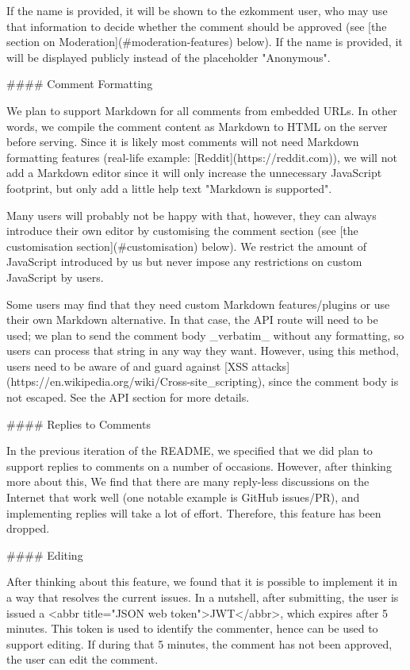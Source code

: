 \documentclass[11pt]{article}
\begin{document}
\begin{markdown}
If the name is provided, it will be shown to the ezkomment user, who may use that information to decide whether the comment should be approved (see [the section on Moderation](#moderation-features) below). If the name is provided, it will be displayed publicly instead of the placeholder "Anonymous".

#### Comment Formatting

We plan to support Markdown for all comments from embedded URLs. In other words, we compile the comment content as Markdown to HTML on the server before serving. Since it is likely most comments will not need Markdown formatting features (real-life example: [Reddit](https://reddit.com)), we will not add a Markdown editor since it will only increase the unnecessary JavaScript footprint, but only add a little help text "Markdown is supported".

Many users will probably not be happy with that, however, they can always introduce their own editor by customising the comment section (see [the customisation section](#customisation) below). We restrict the amount of JavaScript introduced by us but never impose any restrictions on custom JavaScript by users.

Some users may find that they need custom Markdown features/plugins or use their own Markdown alternative. In that case, the API route will need to be used; we plan to send the comment body _verbatim_ without any formatting, so users can process that string in any way they want. However, using this method, users need to be aware of and guard against [XSS attacks](https://en.wikipedia.org/wiki/Cross-site_scripting), since the comment body is not escaped. See the API section for more details.

#### Replies to Comments

In the previous iteration of the README, we specified that we did plan to support replies to comments on a number of occasions. However, after thinking more about this, We find that there are many reply-less discussions on the Internet that work well (one notable example is GitHub issues/PR), and implementing replies will take a lot of effort. Therefore, this feature has been dropped.

#### Editing

After thinking about this feature, we found that it is possible to implement it in a way that resolves the current issues. In a nutshell, after submitting, the user is issued a <abbr title="JSON web token">JWT</abbr>, which expires after 5 minutes. This token is used to identify the commenter, hence can be used to support editing. If during that 5 minutes, the comment has not been approved, the user can edit the comment.


\end{markdown}
\end{document}
